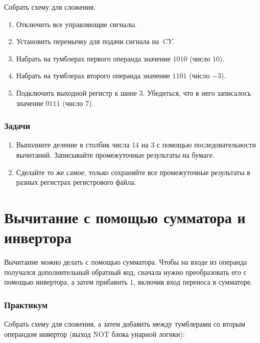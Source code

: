 Собрать схему для сложения.

\begin{enumerate}
    \item Отключить все управляющие сигналы.
    \item Установить перемычку для подачи сигнала на $~CY$.
    \item Набрать на тумблерах первого операнда значение $1010$ (число $10$).
    \item Набрать на тумблерах второго операнда значение $1101$ (число $-3$).
    \item Подключить выходной регистр к шине $3$. Убедиться, что в него записалось значение $0111$ (число $7$).
\end{enumerate}

\subsubsection{Задачи}
\begin{enumerate}
    \item Выполните деление в столбик числа $14$ на $3$ с помощью последовательности вычитаний.
          Записывайте промежуточные результаты на бумаге.
    \item Сделайте то же самое, только сохраняйте все промежуточные результаты в разных
          регистрах регистрового файла.
\end{enumerate}

\section{Вычитание с помощью сумматора и инвертора}

Вычитание можно делать с помощью сумматора. Чтобы на входе из операнда получался дополнительный
обратный код, сначала нужно преобразовать его с помощью инвертора, а затем прибавить $1$,
включив вход переноса в сумматоре.

\subsubsection{Практикум}

Собрать схему для сложения, а затем добавить между тумблерами со вторым операндом
инвертор (выход NOT блока унарной логики):

